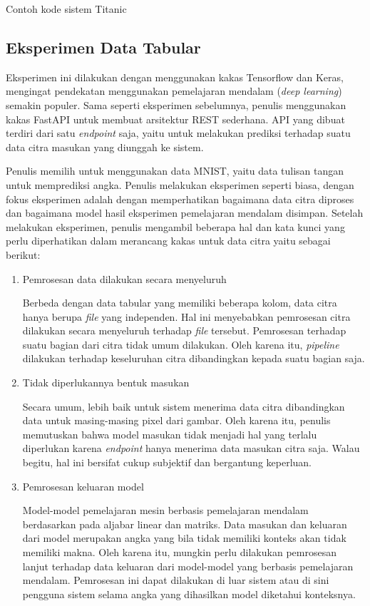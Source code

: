 \begin{listing}[H]
	\caption{Contoh kode sistem Titanic}
	\label{listing:15}
\end{listing}

\subsection{Eksperimen Data Tabular}
Eksperimen ini dilakukan dengan menggunakan kakas Tensorflow dan Keras, mengingat pendekatan menggunakan pemelajaran mendalam (\textit{deep learning}) semakin populer.
Sama seperti eksperimen sebelumnya, penulis menggunakan kakas FastAPI untuk membuat arsitektur REST sederhana.
API yang dibuat terdiri dari satu \textit{endpoint} saja, yaitu untuk melakukan prediksi terhadap suatu data citra masukan yang diunggah ke sistem.

Penulis memilih untuk menggunakan data MNIST, yaitu data tulisan tangan untuk memprediksi angka.
Penulis melakukan eksperimen seperti biasa, dengan fokus eksperimen adalah dengan memperhatikan bagaimana data citra diproses dan bagaimana model hasil eksperimen pemelajaran mendalam disimpan.
Setelah melakukan eksperimen, penulis mengambil beberapa hal dan kata kunci yang perlu diperhatikan dalam merancang kakas untuk data citra yaitu sebagai berikut:

\begin{enumerate}
	\item Pemrosesan data dilakukan secara menyeluruh
	
	Berbeda dengan data tabular yang memiliki beberapa kolom, data citra hanya berupa \textit{file} yang independen.
	Hal ini menyebabkan pemrosesan citra dilakukan secara menyeluruh terhadap \textit{file} tersebut.
	Pemrosesan terhadap suatu bagian dari citra tidak umum dilakukan.
	Oleh karena itu, \textit{pipeline} dilakukan terhadap keseluruhan citra dibandingkan kepada suatu bagian saja. 

	\item Tidak diperlukannya bentuk masukan
	
	Secara umum, lebih baik untuk sistem menerima data citra dibandingkan data untuk masing-masing pixel dari gambar.
	Oleh karena itu, penulis memutuskan bahwa model masukan tidak menjadi hal yang terlalu diperlukan karena \textit{endpoint} hanya menerima data masukan citra saja.
	Walau begitu, hal ini bersifat cukup subjektif dan bergantung keperluan.
	
	\item Pemrosesan keluaran model
	
	Model-model pemelajaran mesin berbasis pemelajaran mendalam berdasarkan pada aljabar linear dan matriks.
	Data masukan dan keluaran dari model merupakan angka yang bila tidak memiliki konteks akan tidak memiliki makna.
	Oleh karena itu, mungkin perlu dilakukan pemrosesan lanjut terhadap data keluaran dari model-model yang berbasis pemelajaran mendalam.
	Pemrosesan ini dapat dilakukan di luar sistem atau di sini pengguna sistem selama angka yang dihasilkan model diketahui konteksnya.

\end{enumerate}

